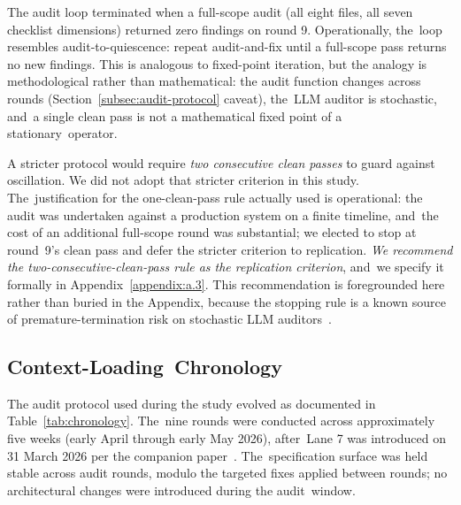 \documentclass[software,article,accept,pdftex,oneauthor]{Definitions/mdpi}
\def\hl#1{#1}
\begin{document}
The audit loop terminated when a full-scope audit (all eight files, all seven checklist dimensions) returned zero findings on round 9. Operationally, the~loop resembles audit-to-quiescence: repeat audit-and-fix until a full-scope pass returns no new findings. This is analogous to fixed-point iteration, but the analogy is methodological rather than mathematical: the audit function changes across rounds (Section~\ref{subsec:audit-protocol} caveat), the~LLM auditor is stochastic, and~a single clean pass is not a mathematical fixed point of a stationary~operator.

A stricter protocol would require \emph{\hl{two consecutive clean passes}} to guard against oscillation. We did not adopt that stricter criterion in this study. The~justification for the one-clean-pass rule actually used is operational: the audit was undertaken against a production system on a finite timeline, and~the cost of an additional full-scope round was substantial; we elected to stop at round~9's clean pass and defer the stricter criterion to replication. \emph{\hl{We recommend the two-consecutive-clean-pass rule as the replication criterion}}, and~we specify it formally in Appendix~\ref{appendix:a.3}. This recommendation is foregrounded here rather than buried in the Appendix, because the stopping rule is a known source of premature-termination risk on stochastic LLM auditors~\cite{wang2023self}.

\subsection{Context-Loading~Chronology}
\label{subsec:chronology}

The audit protocol used during the study evolved as documented in Table~\ref{tab:chronology}. The~nine rounds were conducted across approximately five weeks (early April through early May 2026), after~Lane 7 was introduced on 31 March 2026 per the companion paper~\cite{calboreanu2026aegis_companion}. \hl{The~specification surface was held stable across audit rounds, modulo the targeted fixes applied between rounds;} %
 no architectural changes were introduced during the audit~window.
\end{document}
